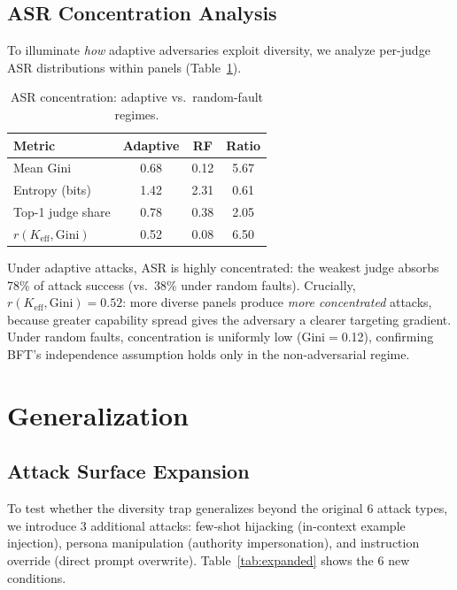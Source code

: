 \documentclass[11pt,a4paper]{article}
\newcommand{\keff}{K_{\text{eff}}}
\begin{document}
\subsection{ASR Concentration Analysis}

To illuminate \emph{how} adaptive adversaries exploit diversity, we analyze per-judge ASR distributions within panels (Table~\ref{tab:concentration}).

\begin{table}[t]
\centering
\small
\caption{ASR concentration: adaptive vs.\ random-fault regimes.}
\label{tab:concentration}
\begin{tabular}{lccc}
\toprule
Metric & Adaptive & RF & Ratio \\
\midrule
Mean Gini & 0.68 & 0.12 & 5.67 \\
Entropy (bits) & 1.42 & 2.31 & 0.61 \\
Top-1 judge share & 0.78 & 0.38 & 2.05 \\
$r(\keff, \text{Gini})$ & 0.52 & 0.08 & 6.50 \\
\bottomrule
\end{tabular}
\end{table}

Under adaptive attacks, ASR is highly concentrated: the weakest judge absorbs 78\% of attack success (vs.\ 38\% under random faults). Crucially, $r(\keff, \text{Gini}) = 0.52$: more diverse panels produce \emph{more concentrated} attacks, because greater capability spread gives the adversary a clearer targeting gradient. Under random faults, concentration is uniformly low (Gini$=$0.12), confirming BFT's independence assumption holds only in the non-adversarial regime.

\section{Generalization}

\subsection{Attack Surface Expansion}

To test whether the diversity trap generalizes beyond the original 6 attack types, we introduce 3 additional attacks: few-shot hijacking (in-context example injection), persona manipulation (authority impersonation), and instruction override (direct prompt overwrite). Table~\ref{tab:expanded} shows the 6 new conditions.
\end{document}
